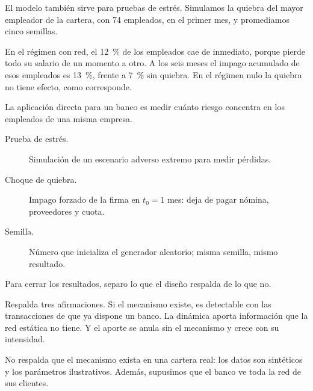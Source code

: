 \begin{decir}
El modelo también sirve para pruebas de estrés. Simulamos la quiebra del mayor empleador
de la cartera, con 74 empleados, en el primer mes, y promediamos cinco semillas.

En el régimen con red, el 12~\% de los empleados cae de inmediato, porque pierde todo su
salario de un momento a otro. A los seis meses el impago acumulado de esos empleados es
13~\%, frente a 7~\% sin quiebra. En el régimen nulo la quiebra no tiene efecto, como
corresponde.

La aplicación directa para un banco es medir cuánto riesgo concentra en los empleados de
una misma empresa.
\end{decir}
\begin{terminos}
\begin{description}
\item[Prueba de estrés.] Simulación de un escenario adverso extremo para medir pérdidas.
\item[Choque de quiebra.] Impago forzado de la firma en $t_0=1$ mes: deja de pagar
nómina, proveedores y cuota.
\item[Semilla.] Número que inicializa el generador aleatorio; misma semilla, mismo
resultado.
\end{description}
\end{terminos}

\begin{decir}
Para cerrar los resultados, separo lo que el diseño respalda de lo que no.

Respalda tres afirmaciones. Si el mecanismo existe, es detectable con las transacciones
de que ya dispone un banco. La dinámica aporta información que la red estática no tiene.
Y el aporte se anula sin el mecanismo y crece con su intensidad.

No respalda que el mecanismo exista en una cartera real: los datos son sintéticos y los
parámetros ilustrativos. Además, supusimos que el banco ve toda la red de sus clientes.
\end{decir}
\begin{preguntas}
\end{preguntas}


